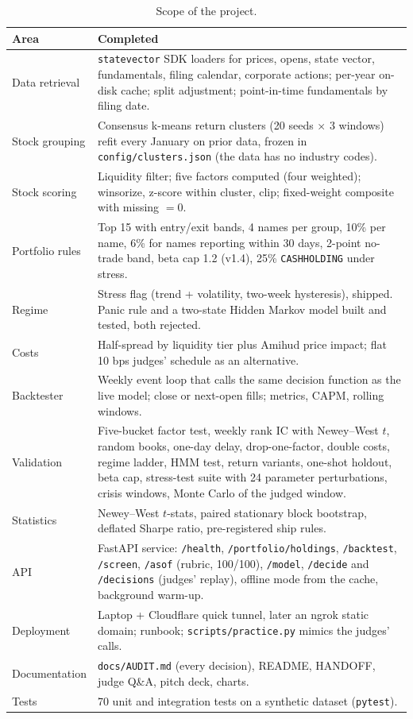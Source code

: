 \documentclass[11pt]{article}
\newcommand{\code}[1]{\texttt{#1}}
\begin{document}
\begin{table}[H]\centering\small
\begin{tabularx}{\textwidth}{lL}
\toprule
Area & Completed \\
\midrule
Data retrieval & \code{statevector} SDK loaders for prices, opens, state vector, fundamentals, filing calendar,
corporate actions; per-year on-disk cache; split adjustment; point-in-time fundamentals by filing date. \\
Stock grouping & Consensus k-means return clusters (20 seeds $\times$ 3 windows) refit every January on prior data,
frozen in \code{config/clusters.json} (the data has no industry codes). \\
Stock scoring & Liquidity filter; five factors computed (four weighted); winsorize, z-score within cluster, clip;
fixed-weight composite with missing $=0$. \\
Portfolio rules & Top 15 with entry/exit bands, 4 names per group, 10\% per name, 6\% for names reporting within 30
days, 2-point no-trade band, beta cap 1.2 (v1.4), 25\% \code{CASHHOLDING} under stress. \\
Regime & Stress flag (trend + volatility, two-week hysteresis), shipped. Panic rule and a two-state Hidden Markov
model built and tested, both rejected. \\
Costs & Half-spread by liquidity tier plus Amihud price impact; flat 10 bps judges' schedule as an alternative. \\
Backtester & Weekly event loop that calls the same decision function as the live model; close or next-open fills;
metrics, CAPM, rolling windows. \\
Validation & Five-bucket factor test, weekly rank IC with Newey--West $t$, random books, one-day delay, drop-one-factor,
double costs, regime ladder, HMM test, return variants, one-shot holdout, beta cap, stress-test suite with 24
parameter perturbations, crisis windows, Monte Carlo of the judged window. \\
Statistics & Newey--West $t$-stats, paired stationary block bootstrap, deflated Sharpe ratio, pre-registered ship rules. \\
API & FastAPI service: \code{/health}, \code{/portfolio/holdings}, \code{/backtest}, \code{/screen}, \code{/asof}
(rubric, 100/100), \code{/model}, \code{/decide} and \code{/decisions} (judges' replay), offline mode from the
cache, background warm-up. \\
Deployment & Laptop + Cloudflare quick tunnel, later an ngrok static domain; runbook; \code{scripts/practice.py}
mimics the judges' calls. \\
Documentation & \code{docs/AUDIT.md} (every decision), README, HANDOFF, judge Q\&A, pitch deck, charts. \\
Tests & 70 unit and integration tests on a synthetic dataset (\code{pytest}). \\
\bottomrule
\end{tabularx}
\caption{Scope of the project.}
\end{table}
\end{document}
